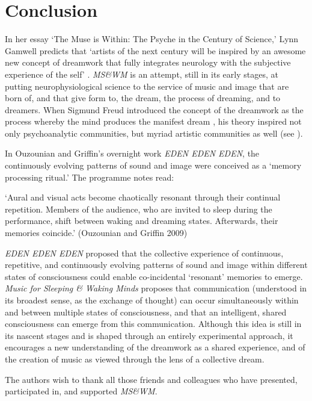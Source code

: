 \section{Conclusion}

In her essay `The Muse is Within: The Psyche in the Century of Science,' Lynn Gamwell predicts that `artists of the next century will be inspired by an awesome new concept of dreamwork that fully integrates neurology with the subjective experience of the self' \cite[p.55]{Gamwell:2000}. \textit{MS\&WM }is an attempt, still in its early stages, at putting neurophysiological science to the service of music and image that are born of, and that give form to, the dream, the process of dreaming, and to dreamers. When Sigmund Freud introduced the concept of the dreamwork as the process whereby the mind produces the manifest dream \cite{Freud:1927}, his theory inspired not only psychoanalytic communities, but myriad artistic communities as well (see \cite[p.9]{Ruhs:2000}).

In Ouzounian and Griffin's overnight work \textit{EDEN EDEN EDEN}, the
continuously evolving patterns of sound and image were conceived as a `memory
processing ritual.' The programme notes read:

`Aural and visual acts become chaotically resonant through their continual
repetition. Members of the audience, who are invited to sleep during the
performance, shift between waking and dreaming states. Afterwards, their memories
coincide.' (Ouzounian and Griffin 2009) \cite{Ouzounian:2009}

\textit{EDEN EDEN EDEN }proposed that the collective experience of continuous,
repetitive, and continuously evolving patterns of sound and image within
different states of consciousness could enable co-incidental `resonant' memories
to emerge. \textit{Music for Sleeping \& Waking Minds} proposes that
communication (understood in its broadest sense, as the exchange of thought) can
occur simultaneously within and between multiple states of consciousness, and
that an intelligent, shared consciousness can emerge from this communication. 
Although this idea is still in its nascent stages and is shaped through an
entirely experimental approach, it encourages a new understanding of the
dreamwork as a shared experience, and of the creation of music as viewed through
the lens of a collective dream.

\begin{acknowledgement}
The authors wish to thank all those friends and colleagues who have presented, participated in, and supported \textit{MS\&WM}.
\end{acknowledgement}

